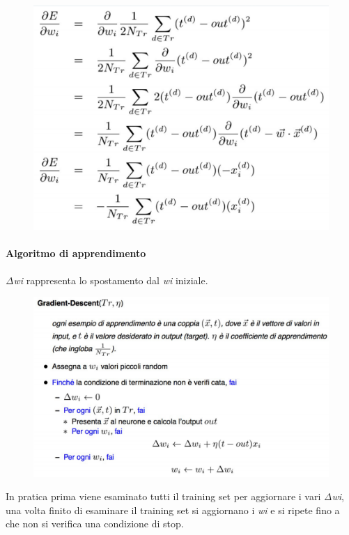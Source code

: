 \begin{figure}[htbp]
\centering
\includegraphics{./notes/immagini/l10-step-passaggi.png}
\caption{}
\end{figure}

\paragraph{Algoritmo di apprendimento}\label{algoritmo-di-apprendimento}

\emph{Δwi} rappresenta lo spostamento dal \emph{wi} iniziale.

\begin{figure}[htbp]
\centering
\includegraphics{./notes/immagini/l10-algoritmo-gradiente.png}
\caption{}
\end{figure}

In pratica prima viene esaminato tutti il training set per aggiornare i
vari \emph{Δwi}, una volta finito di esaminare il training set si
aggiornano i \emph{wi} e si ripete fino a che non si verifica una
condizione di stop.

